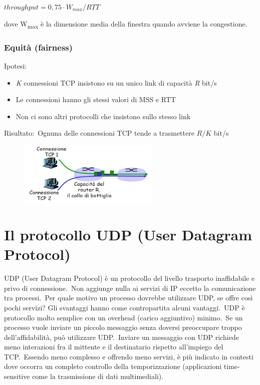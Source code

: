 \begin{center}
    $throughput = 0,75 \cdot W_{max}/RTT$
\end{center}
dove W\textsubscript{max} è la dimensione media della finestra quando avviene la congestione.

\pagebreak

\subsubsection{Equità (fairness)}

Ipotesi:\
\begin{itemize}
    \item \textit{K} connessioni TCP insistono su un unico link di capacità \textit{R} bit/s
    \item Le connessioni hanno gli stessi valori di MSS e RTT
    \item Non ci sono altri protocolli che insistono sullo stesso link
\end{itemize}
Risultato:\ Ognuna delle connessioni TCP tende a trasmettere $R/K$ bit/s
\begin{figure}[H]
    \centering
    \includegraphics[width=0.6\textwidth]{immagini/Fairness_TCP.png}
\end{figure}

\section{Il protocollo UDP (User Datagram Protocol)}

UDP (User Datagram Protocol) è un protocollo del livello trasporto inaffidabile e privo di connessione.\
Non aggiunge nulla ai servizi di IP eccetto la comunicazione tra processi.\
Per quale motivo un processo dovrebbe utilizzare UDP, se offre così pochi servizi? Gli svantaggi hanno come contropartita alcuni vantaggi.\
UDP è protocollo molto semplice con un overhead (carico aggiuntivo) minimo.\
Se un processo vuole inviare un piccolo messaggio senza doversi preoccupare troppo dell'affidabilità, può utilizzare UDP.\
Inviare un messaggio con UDP richiede meno interazioni fra il mittente e il destinatario rispetto all'impiego del TCP.\
Essendo meno complesso e offrendo meno servizi, è più indicato in contesti dove occorra un completo controllo della temporizzazione (applicazioni time-sensitive come la trasmissione di dati multimediali).

